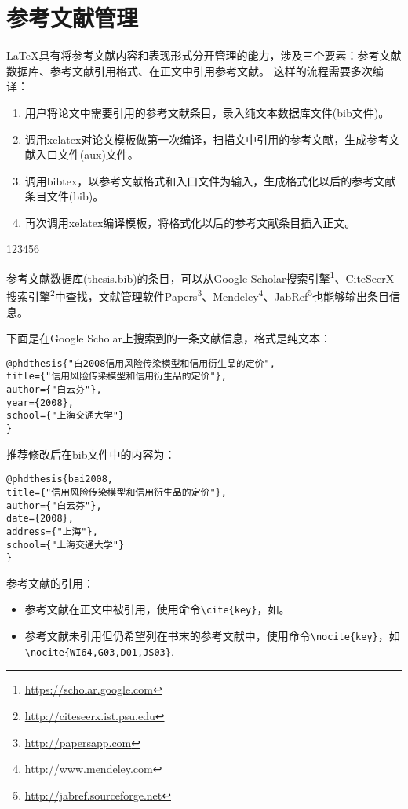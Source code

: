 \section{参考文献管理}
\label{sec2.5}
\LaTeX 具有将参考文献内容和表现形式分开管理的能力，涉及三个要素：参考文献数据库、参考文献引用格式、在正文中引用参考文献。
这样的流程需要多次编译：
\begin{enumerate}[noitemsep,topsep=0pt,parsep=0pt,partopsep=0pt]
\item 用户将论文中需要引用的参考文献条目，录入纯文本数据库文件(bib文件)。
\item 调用xelatex对论文模板做第一次编译，扫描文中引用的参考文献，生成参考文献入口文件(aux)文件。
\item 调用bibtex，以参考文献格式和入口文件为输入，生成格式化以后的参考文献条目文件(bib)。
\item 再次调用xelatex编译模板，将格式化以后的参考文献条目插入正文。
\end{enumerate}

123456\cite{123a}

参考文献数据库(thesis.bib)的条目，可以从Google Scholar搜索引擎\footnote{\url{https://scholar.google.com}}、CiteSeerX搜索引擎\footnote{\url{http://citeseerx.ist.psu.edu}}中查找，文献管理软件Papers\footnote{\url{http://papersapp.com}}、Mendeley\footnote{\url{http://www.mendeley.com}}、JabRef\footnote{\url{http://jabref.sourceforge.net}}也能够输出条目信息。

下面是在Google Scholar上搜索到的一条文献信息，格式是纯文本：

\begin{lstlisting}[caption={从Google Scholar找到的参考文献条目}, label=googlescholar, escapeinside="", numbers=none]
@phdthesis{"白2008信用风险传染模型和信用衍生品的定价",
title={"信用风险传染模型和信用衍生品的定价"},
author={"白云芬"},
year={2008},
school={"上海交通大学"}
}
\end{lstlisting}

推荐修改后在bib文件中的内容为：

\begin{lstlisting}[caption={修改后的参考文献条目}, label=itemok, escapeinside="", numbers=none]
@phdthesis{bai2008,
title={"信用风险传染模型和信用衍生品的定价"},
author={"白云芬"},
date={2008},
address={"上海"},
school={"上海交通大学"}
}
\end{lstlisting}

参考文献的引用：
\begin{itemize}
\item 参考文献在正文中被引用，使用命令\verb+\cite{key}+，如\cite{M91}。
\item 参考文献未引用但仍希望列在书末的参考文献中，使用命令\verb+\nocite{key}+，如\verb+\nocite{WI64,G03,D01,JS03}+.
\end{itemize}
\nocite{WI64,G03,D01,JS03}
